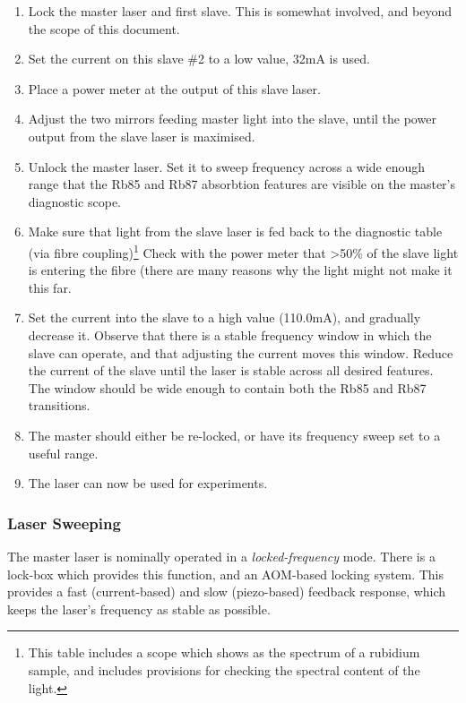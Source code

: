 \begin{enumerate}
 \item Lock the master laser and first slave.  This is somewhat involved, and beyond the scope of this document.
 \item Set the current on this slave \#2 to a low value, 32mA is used.
 \item Place a power meter at the output of this slave laser.
 \item Adjust the two mirrors feeding master light into the slave, until the power output from the slave laser is maximised.
 \item Unlock the master laser.  Set it to sweep frequency across a wide enough range that the Rb85 and Rb87 absorbtion features are visible on the master's diagnostic scope.
 \item Make sure that light from the slave laser is fed back to the diagnostic table (via fibre coupling)\footnote{This table includes a scope which shows as the spectrum of a rubidium sample, and includes provisions for checking the spectral content of the light.}  Check with the power meter that >50\% of the slave light is entering the fibre (there are many reasons why the light might not make it this far.
 \item Set the current into the slave to a high value (110.0mA), and gradually decrease it.  Observe that there is a stable frequency window in which the slave can operate, and that adjusting the current moves this window.  Reduce the current of the slave until the laser is stable across all desired features.  The window should be wide enough to contain both the Rb85 and Rb87 transitions.
 \item The master should either be re-locked, or have its frequency sweep set to a useful range.
 \item The laser can now be used for experiments.
\end{enumerate}
    
    \subsubsection{Laser Sweeping}
    
The master laser is nominally operated in a \emph{locked-frequency} mode.  There is a lock-box which provides this function, and an AOM-based locking system.  This provides a fast (current-based) and slow (piezo-based) feedback response, which keeps the laser's frequency as stable as possible.

